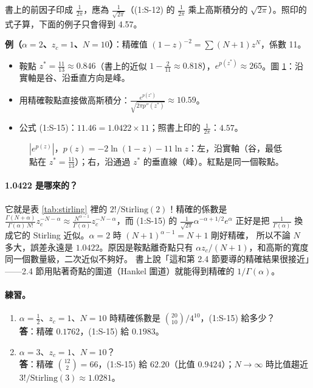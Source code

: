 \begin{errbox}[p.~23，(1:S-15)]
書上的前因子印成 $\frac1{2\pi}$，應為 $\frac1{\sqrt{2\pi}}$（(1:S-12) 的 $\frac{1}{2\pi}$ 乘上高斯積分的 $\sqrt{2\pi}$）。照印的式子算，下面的例子只會得到 4.57。
\end{errbox}

\textbf{例（$\alpha=2$、$z_c=1$、$N=10$）}：精確值 $(1-z)^{-2}=\sum(N+1)z^N$，係數 11。
\begin{itemize}[nosep]
\item 鞍點 $z^*=\frac{11}{13}\approx0.846$（書上的近似 $1-\frac{2}{11}\approx0.818$），$e^{p(z^*)}\approx265$。圖 \ref{fig:saddle}：沿實軸是谷、沿垂直方向是峰。
\item 用精確鞍點直接做高斯積分：$\frac{e^{p(z^*)}}{\sqrt{2\pi p''(z^*)}}\approx10.59$。
\item 公式 (1:S-15)：$11.46=1.0422\times11$；照書上印的 $\frac1{2\pi}$：$4.57$。
\end{itemize}

\begin{figure}[H]
\centering
\FigSaddle
\caption{$|e^{p(z)}|$，$p(z)=-2\ln(1-z)-11\ln z$：左，沿實軸（谷，最低點在 $z^*=\tfrac{11}{13}$）；右，沿通過 $z^*$ 的垂直線（峰）。紅點是同一個鞍點。}
\label{fig:saddle}
\end{figure}

\paragraph{1.0422 是哪來的？}
它就是表 \ref{tab:stirling} 裡的 $2!/\text{Stirling}(2)$！精確的係數是
$\frac{\Gamma(N+\alpha)}{\Gamma(\alpha)\,N!}z_c^{-N-\alpha}\approx\frac{N^{\alpha-1}}{\Gamma(\alpha)}z_c^{-N-\alpha}$，而 (1:S-15) 的
$\frac1{\sqrt{2\pi}}\alpha^{-\alpha+1/2}e^{\alpha}$ 正好是把 $\frac1{\Gamma(\alpha)}$ 換成它的 Stirling 近似。$\alpha=2$ 時 $(N+1)^{\alpha-1}=N+1$ 剛好精確，
所以不論 $N$ 多大，誤差永遠是 $1.0422$。原因是鞍點離奇點只有 $\alpha z_c/(N+1)$，和高斯的寬度同一個數量級，二次近似不夠好。
書上說「這和第 2.4 節要導的精確結果很接近」——2.4 節用貼著奇點的圍道（Hankel 圍道）就能得到精確的 $1/\Gamma(\alpha)$。

\paragraph{練習。}
\begin{enumerate}[label=(\alph*)]
\item $\alpha=\tfrac12$、$z_c=1$、$N=10$ 時精確係數是 $\binom{20}{10}/4^{10}$，(1:S-15) 給多少？\\
  \textbf{答}：精確 $0.1762$，(1:S-15) 給 $0.1983$。
\item $\alpha=3$、$z_c=1$、$N=10$？\\
  \textbf{答}：精確 $\binom{12}{2}=66$，(1:S-15) 給 $62.20$（比值 $0.9424$）；$N\to\infty$ 時比值趨近 $3!/\text{Stirling}(3)\approx1.0281$。
\end{enumerate}

